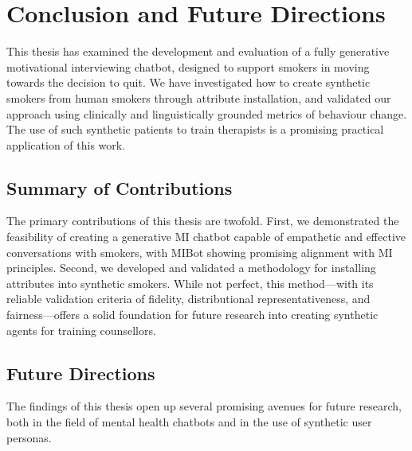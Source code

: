 \chapter{Conclusion and Future Directions}
\label{ch:conclusion}

This thesis has examined the development and evaluation of a fully generative motivational interviewing chatbot, designed to support smokers in moving towards the decision to quit. We have investigated how to create synthetic smokers from human smokers through attribute installation, and validated our approach using clinically and linguistically grounded metrics of behaviour change. The use of such synthetic patients to train therapists is a promising practical application of this work.


\section{Summary of Contributions}

The primary contributions of this thesis are twofold. First, we demonstrated the feasibility of creating a generative MI chatbot capable of empathetic and effective conversations with smokers, with MIBot showing promising alignment with MI principles. Second, we developed and validated a methodology for installing attributes into synthetic smokers. While not perfect, this method---with its reliable validation criteria of fidelity, distributional representativeness, and fairness---offers a solid foundation for future research into creating synthetic agents for training counsellors.


\section{Future Directions}
The findings of this thesis open up several promising avenues for future research, both in the field of mental health chatbots and in the use of synthetic user personas.

